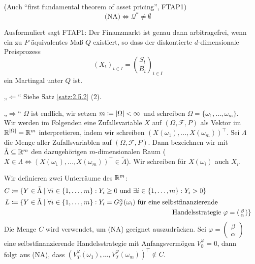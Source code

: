 \documentclass[a4paper,twoside,DIV15,BCOR12mm]{scrbook}
\newcommand{\cF}{\mathcal F}
\newcommand{\cQ}{\mathcal Q}
\begin{document}
\begin{satz}
(Auch “first fundamental theorem of asset pricing”, FTAP1)\label{satz:2.5.4}
\[
\text{(NA)} \iff \cQ^* \ne\emptyset
\]
\end{satz}

\begin{bemerkung}
Ausformuliert sagt FTAP1: Der Finanzmarkt ist genau dann arbitragefrei, wenn ein zu $P$ äquivalentes Maß $Q$ existiert, so dass der diskontierte $d$-dimensionale Preisprozess
\[
(X_t)_{t\in I} =\left( \frac{S_t}{B_t}\right)_{t\in I}
\]
ein Martingal unter $Q$ ist.
\end{bemerkung}

\begin{beweis}
„$\Longleftarrow$“ Siehe Satz \ref{satz:2.5.2} (2).

„$\Longrightarrow$“ $\Omega$ ist endlich, wir setzen $m\da |\Omega|<\infty$ und schreiben $\Omega = \{\omega_1,\ldots, \omega_m\}$. Wir werden im Folgenden eine Zufallsvariable $X$ auf $(\Omega,\cF, P)$ als Vektor im $\mathbb{R}^{|\Omega|} =\mathbb{R}^m$ interpretieren, indem wir schreiben $(X(\omega_1),\ldots,X(\omega_m))^\top$. Sei $\Lambda$ die Menge aller Zufallsvariablen auf $(\Omega,\cF, P)$. Dann bezeichnen wir mit $\tilde\Lambda\subseteq \mathbb{R}^m$ den dazugehörigen $m$-dimensionalen Raum ($X\in\Lambda\iff (X(\omega_1),\ldots,X(\omega_m))^\top\in \tilde\Lambda$). Wir schreiben für $X(\omega_i)$ auch $X_i$.

Wir definieren zwei Unterräume des $\mathbb{R}^m$:
\begin{align*}
C &\da \{ Y\in \tilde\Lambda\mid \forall i\in\{1,\ldots,m\}: Y_i \ge 0 \text{ und } \exists i\in\{1,\ldots,m\}: Y_i > 0\} \\
L &\da \{ Y\in \tilde\Lambda\mid \forall i\in\{1,\ldots,m\}: Y_i = G_T^\alpha(\omega_i) \text{ für eine selbstfinanzierende} \\
&\hspace{24em}\text{Handelsstrategie } 
\varphi=\left(\begin{smallmatrix} \beta \\ \alpha \end{smallmatrix}\right)\}
\end{align*}
Die Menge $C$ wird verwendet, um (NA) geeignet auszudrücken. Sei 
$\varphi=\left(\begin{smallmatrix} \beta \\ \alpha \end{smallmatrix}\right)$
eine selbstfinanzierende Handelsstrategie mit Anfangsvermögen $V_0^\varphi = 0$, dann folgt aus (NA), dass $(V_T^\varphi(\omega_1),\ldots, V_T^\varphi(\omega_m))^\top\notin C$.


\end{beweis}
\end{document}

